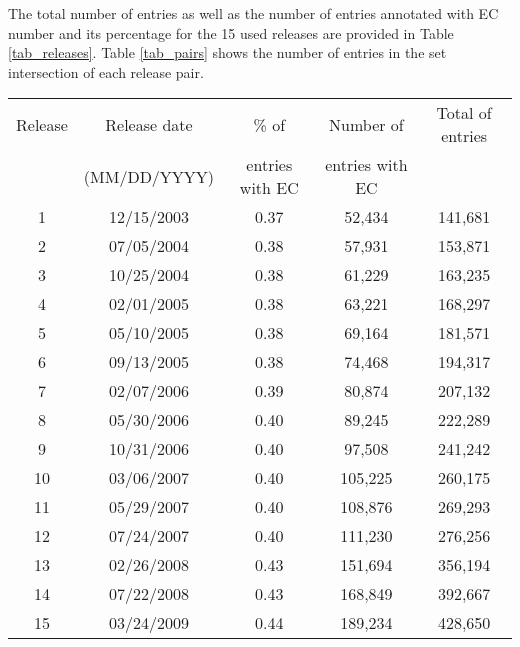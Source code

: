 The total number of entries as well as the number of entries annotated with EC number and its percentage for the 15 used releases are provided in Table \ref{tab_releases}. Table \ref{tab_pairs} shows the number of entries in the set intersection of each release pair. 


\begin{table*}[!h]
  \caption{Releases 1 to 15 of UniProt/SwissProt.}
  \label{tab_releases}
  \scriptsize
  \begin{center}
    \begin{tabular}{ccccc}
      Release & Release date & \% of & Number of & Total of entries\\
& (MM/DD/YYYY) & entries with EC & entries with EC & \\
    \hline
	1 & 12/15/2003 & 0.37 & 52,434 & 141,681 \\
	2 & 07/05/2004 & 0.38 & 57,931 & 153,871 \\ 
	3 & 10/25/2004 & 0.38 & 61,229 & 163,235 \\ 
	4 & 02/01/2005 & 0.38 & 63,221 & 168,297 \\ 
	5 & 05/10/2005 & 0.38 & 69,164 & 181,571 \\ 
	6 & 09/13/2005 & 0.38 & 74,468 & 194,317 \\ 
	7 & 02/07/2006 & 0.39 & 80,874 & 207,132 \\ 
	8 & 05/30/2006 & 0.40 & 89,245 & 222,289 \\ 
	9 & 10/31/2006 & 0.40 & 97,508 & 241,242 \\ 
	10 & 03/06/2007 & 0.40 & 105,225 & 260,175 \\ 
	11 & 05/29/2007 & 0.40 & 108,876 & 269,293 \\ 
	12 & 07/24/2007 & 0.40 & 111,230 & 276,256 \\ 
	13 & 02/26/2008 & 0.43 & 151,694 & 356,194 \\ 
	14 & 07/22/2008 & 0.43 & 168,849 & 392,667 \\ 
	15 & 03/24/2009 & 0.44 & 189,234 & 428,650 \\ 
    \end{tabular}
  \end{center}
\end{table*}


